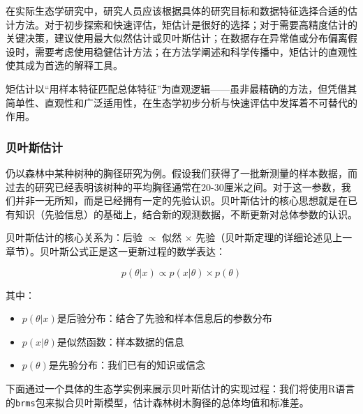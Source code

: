 \documentclass[
  twoside,12pt,fontset=none]{ctexbook}
\providecommand{\tightlist}{%
  \setlength{\itemsep}{0pt}\setlength{\parskip}{0pt}}
\begin{document}
在实际生态学研究中，研究人员应该根据具体的研究目标和数据特征选择合适的估计方法。对于初步探索和快速评估，矩估计是很好的选择；对于需要高精度估计的关键决策，建议使用最大似然估计或贝叶斯估计；在数据存在异常值或分布偏离假设时，需要考虑使用稳健估计方法；在方法学阐述和科学传播中，矩估计的直观性使其成为首选的解释工具。

矩估计以``用样本特征匹配总体特征''为直观逻辑------虽非最精确的方法，但凭借其简单性、直观性和广泛适用性，在生态学初步分析与快速评估中发挥着不可替代的作用。

\hypertarget{ux8d1dux53f6ux65afux4f30ux8ba1}{%
\subsubsection{贝叶斯估计}\label{ux8d1dux53f6ux65afux4f30ux8ba1}}

仍以森林中某种树种的胸径研究为例。假设我们获得了一批新测量的样本数据，而过去的研究已经表明该树种的平均胸径通常在20-30厘米之间。对于这一参数，我们并非一无所知，而是已经拥有一定的先验认识。贝叶斯估计的核心思想就是在已有知识（先验信息）的基础上，结合新的观测数据，不断更新对总体参数的认识。

贝叶斯估计的核心关系为：后验 \(\propto\) 似然 \(\times\) 先验（贝叶斯定理的详细论述见上一章节）。贝叶斯公式正是这一更新过程的数学表达：

\[p(\theta|x) \propto p(x|\theta) \times p(\theta)\]

其中：

\begin{itemize}
\tightlist
\item
  \(p(\theta|x)\)是后验分布：结合了先验和样本信息后的参数分布\\
\item
  \(p(x|\theta)\)是似然函数：样本数据的信息\\
\item
  \(p(\theta)\)是先验分布：我们已有的知识或信念
\end{itemize}

下面通过一个具体的生态学实例来展示贝叶斯估计的实现过程：我们将使用R语言的\texttt{brms}包来拟合贝叶斯模型，估计森林树木胸径的总体均值和标准差。
\end{document}
